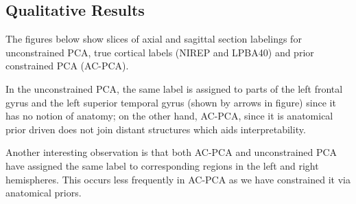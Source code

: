 \documentclass{llncs}
\begin{document}
{\subsection{Qualitative Results}

The figures below show slices of axial and sagittal section labelings for unconstrained PCA, true cortical labels (NIREP and LPBA40) and prior constrained PCA (AC-PCA).


In the unconstrained PCA, the same label is assigned to parts of the left frontal gyrus and the left superior temporal gyrus (shown by arrows in figure) since it has no notion of anatomy; on the other hand, AC-PCA, since it is anatomical prior driven does not join distant structures which aids interpretability.

Another interesting observation is that both AC-PCA and unconstrained PCA have assigned  the same label to corresponding regions in the left and right hemispheres. This occurs less frequently in AC-PCA as we have constrained it via anatomical priors.  %

}
\end{document}
